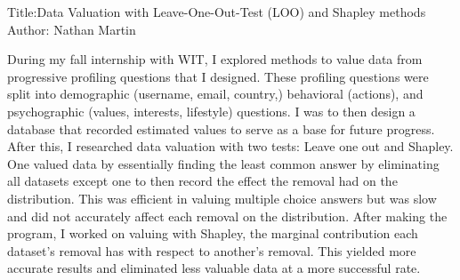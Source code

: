 ﻿Title:Data Valuation with Leave-One-Out-Test (LOO) and Shapley methods
Author: Nathan Martin


During my fall internship with WIT, I explored methods to value  data from progressive profiling questions that I designed. These profiling questions were split into demographic (username, email, country,) behavioral (actions), and psychographic (values, interests, lifestyle) questions. I was to then design a database that recorded estimated values to serve as a base for future progress. After this, I researched data valuation with two tests: Leave one out and Shapley. One valued data by essentially finding the least common answer by eliminating all datasets except one to  then record the effect the removal had on the distribution. This was efficient in valuing multiple choice answers but was slow and did not accurately affect each removal on the distribution. After making the program, I worked on valuing with Shapley, the marginal contribution each dataset’s removal has with respect to another’s removal. This yielded more accurate results and eliminated less valuable data at a more successful rate.